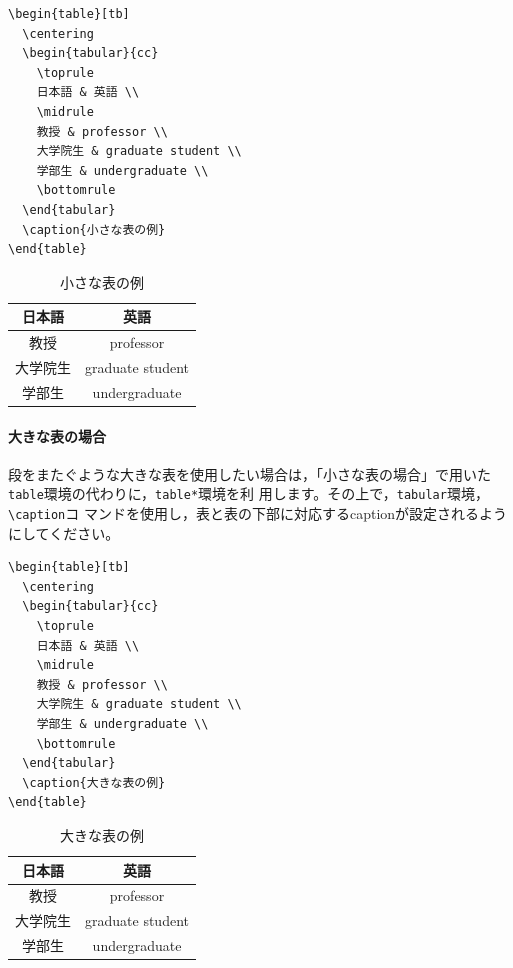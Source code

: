 \documentclass[b5paper,10pt,twocolumn,tombow]{jarticle}
\begin{document}
\begin{verbatim}
\begin{table}[tb]
  \centering
  \begin{tabular}{cc}
    \toprule
    日本語 & 英語 \\
    \midrule
    教授 & professor \\
    大学院生 & graduate student \\
    学部生 & undergraduate \\
    \bottomrule
  \end{tabular}
  \caption{小さな表の例}
\end{table}
\end{verbatim}

\begin{table}[tb]
  \centering
  \begin{tabular}{cc}
    \toprule
    日本語 & 英語 \\
    \midrule
    教授 & professor \\
    大学院生 & graduate student \\
    学部生 & undergraduate \\
    \bottomrule
  \end{tabular}
  \caption{小さな表の例}
\end{table}

\paragraph*{大きな表の場合}
段をまたぐような大きな表を使用したい場合は，「小さな表の場合」で用いた
\texttt{table}環境の代わりに，\texttt{table*}環境を利
用します。その上で，\texttt{tabular}環境，\verb|\caption|コ
マンドを使用し，表と表の下部に対応するcaptionが設定されるようにしてください。

\begin{verbatim}
\begin{table}[tb]
  \centering
  \begin{tabular}{cc}
    \toprule
    日本語 & 英語 \\
    \midrule
    教授 & professor \\
    大学院生 & graduate student \\
    学部生 & undergraduate \\
    \bottomrule
  \end{tabular}
  \caption{大きな表の例}
\end{table}
\end{verbatim}

\begin{table}[tb]
  \centering
  \begin{tabular}{cc}
    \toprule
    日本語 & 英語 \\
    \midrule
    教授 & professor \\
    大学院生 & graduate student \\
    学部生 & undergraduate \\
    \bottomrule
  \end{tabular}
  \caption{大きな表の例}
\end{table}
\end{document}
